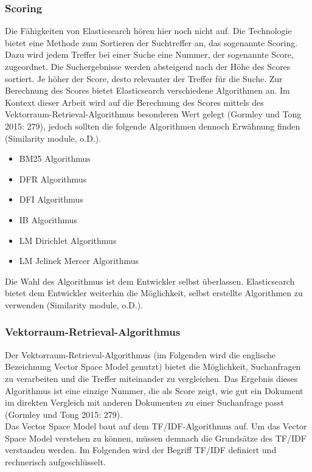 \documentclass[a4paper]{scrartcl}
\begin{document}
\subsubsection{Scoring}
Die Fähigkeiten von Elasticsearch hören hier noch nicht auf. Die Technologie bietet eine Methode zum Sortieren der Suchtreffer an, das sogenannte Scoring. Dazu wird jedem Treffer bei einer Suche eine Nummer, der sogenannte Score, zugeordnet. Die Suchergebnisse werden absteigend nach der Höhe des Scores sortiert. Je höher der Score, desto relevanter der Treffer für die Suche. Zur Berechnung des Scores bietet Elasticsearch verschiedene Algorithmen an. Im Kontext dieser Arbeit wird auf die Berechnung des Scores mittels des Vektorraum-Retrieval-Algorithmus besonderen Wert gelegt (Gormley und Tong 2015: 279), jedoch sollten die folgende Algorithmen dennoch Erwähnung finden (Similarity module, o.D.).

\begin{itemize}
	\item BM25 Algorithmus
	\item DFR Algorithmus
	\item DFI Algorithmus
	\item IB Algorithmus
	\item LM Dirichlet Algorithmus
	\item LM Jelinek Mercer Algorithmus
\end{itemize}

Die Wahl des Algorithmus ist dem Entwickler selbst überlassen. Elasticsearch bietet dem Entwickler weiterhin die Möglichkeit, selbst erstellte Algorithmen zu verwenden (Similarity module, o.D.).

\subsubsection{Vektorraum-Retrieval-Algorithmus}
Der Vektorraum-Retrieval-Algorithmus (im Folgenden wird die englische Bezeichnung Vector Space Model genutzt) bietet die Möglichkeit, Suchanfragen zu verarbeiten und die Treffer miteinander zu vergleichen. Das Ergebnis dieses Algorithmus ist eine einzige Nummer, die als Score zeigt, wie gut ein Dokument im direkten Vergleich mit anderen Dokumenten zu einer Suchanfrage passt (Gormley und Tong 2015: 279). \\

Das Vector Space Model baut auf dem TF/IDF-Algorithmus auf. Um das Vector Space Model verstehen zu können, müssen demnach die Grundsätze des TF/IDF verstanden werden. Im Folgenden wird der Begriff TF/IDF definiert und rechnerisch aufgeschlüsselt.
\end{document}
